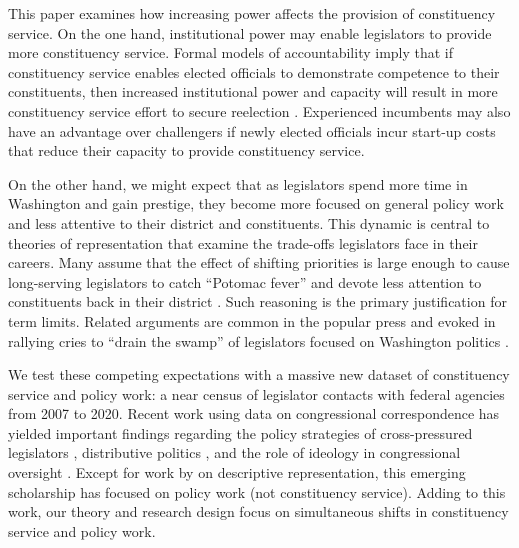 \documentclass[12pt]{article}
\begin{document}

This paper examines how increasing power affects the provision of constituency service. On the one hand, institutional power may enable legislators to provide more constituency service. Formal models of accountability imply that if constituency service enables elected officials to demonstrate competence to their constituents, then increased institutional power and capacity will result in more constituency service effort to secure reelection  \citep{AshworthBuenodeMesquita2006}. Experienced incumbents may also have an advantage over challengers if newly elected officials incur start-up costs that reduce their capacity to provide constituency service. %

On the other hand, we might expect that as legislators spend more time in Washington and gain prestige, they become more focused on general policy work and less attentive to their district and constituents. This dynamic is central to theories of representation that examine the trade-offs legislators face in their careers.  Many assume that the effect of shifting priorities is large enough to cause long-serving legislators to catch ``Potomac fever'' and devote less attention to constituents back in their district \citep{Fenno1978}. Such reasoning is the primary justification for term limits. Related arguments are common in the popular press \citep{Edwards2005} and evoked in rallying cries to ``drain the swamp'' of legislators focused on Washington politics \citep{Rosenblatt2016}.

We test these competing expectations with a massive new dataset of constituency service and policy work: a near census of legislator contacts with federal agencies from 2007 to 2020. Recent work using data on congressional correspondence has yielded important findings regarding the policy strategies of cross-pressured legislators \citep{Ritchie2017}, distributive politics \citep{MillsKalafHuges2015}, and the role of ideology in congressional oversight \citep{Lowande2018JOP}. Except for work by \citet{LowandeRitchieLauterbach2018} on descriptive representation, this emerging scholarship has focused on policy work (not constituency service). Adding to this work, our theory and research design focus on simultaneous shifts in constituency service and policy work. %
\end{document}
